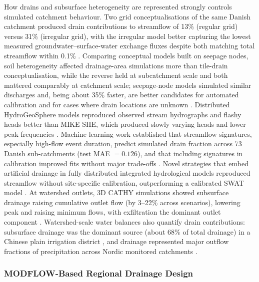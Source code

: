 \documentclass[11pt]{article}
\begin{document}
How drains and subsurface heterogeneity are represented strongly controls simulated catchment behaviour. Two grid conceptualisations of the same Danish catchment produced drain contributions to streamflow of 13\% (regular grid) versus 31\% (irregular grid), with the irregular model better capturing the lowest measured groundwater--surface-water exchange fluxes despite both matching total streamflow within 0.1\% \parencite{Karan2021}. Comparing conceptual models built on seepage nodes, soil heterogeneity affected drainage-area simulations more than tile-drain conceptualisation, while the reverse held at subcatchment scale and both mattered comparably at catchment scale; seepage-node models simulated similar discharges and, being about 35\% faster, are better candidates for automated calibration and for cases where drain locations are unknown \parencite{Boico2022}. Distributed HydroGeoSphere models reproduced observed stream hydrographs and flashy heads better than MIKE SHE, which produced slowly varying heads and lower peak frequencies \parencite{DeSchepper2017}. Machine-learning work established that streamflow signatures, especially high-flow event duration, predict simulated drain fraction across 73 Danish sub-catchments (test MAE $=0.126$), and that including signatures in calibration improved fits without major trade-offs \parencite{Schneider2022}. Novel strategies that embed artificial drainage in fully distributed integrated hydrological models reproduced streamflow without site-specific calibration, outperforming a calibrated SWAT model \parencite{Rathore2024}. At watershed outlets, 3D CATHY simulations showed subsurface drainage raising cumulative outlet flow (by 3--22\% across scenarios), lowering peak and raising minimum flows, with exfiltration the dominant outlet component \parencite{Muma2016}. Watershed-scale water balances also quantify drain contributions: subsurface drainage was the dominant source (about 68\% of total drainage) in a Chinese plain irrigation district \parencite{Zheng2025b}, and drainage represented major outflow fractions of precipitation across Nordic monitored catchments \parencite{Nousiainen2015,Turunen2013}.

\subsubsection{MODFLOW-Based Regional Drainage Design}
\end{document}
